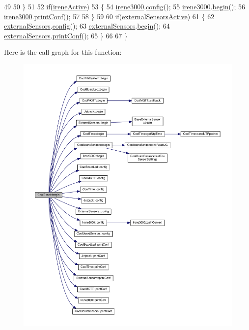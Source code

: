 \begin{DoxyCode}
49 
50     \}
51 
52     \textcolor{keywordflow}{if}(\hyperlink{classCoolBoard_a1de9b5516695b2e1668bf2e3a6701332}{ireneActive})
53     \{
54         \hyperlink{classCoolBoard_ad103718ce316006c4695b8eb312eaf11}{irene3000}.\hyperlink{classIrene3000_afed5c35e4b23963c157847ef27c11e9c}{config}();
55         \hyperlink{classCoolBoard_ad103718ce316006c4695b8eb312eaf11}{irene3000}.\hyperlink{classIrene3000_ad5891806c500ae1007afe52b9e304c2b}{begin}();
56         \hyperlink{classCoolBoard_ad103718ce316006c4695b8eb312eaf11}{irene3000}.\hyperlink{classIrene3000_a7bc2414100b5e19eacc6630fa34b2654}{printConf}();
57 
58     \}
59 
60     \textcolor{keywordflow}{if}(\hyperlink{classCoolBoard_af29860cc422622dc33614f9eabb58c40}{externalSensorsActive})
61     \{
62         \hyperlink{classCoolBoard_a09e26264839c65873eb56af476eff6b2}{externalSensors}.\hyperlink{classExternalSensors_a862a4bd11346b37270d0244c2adabe5a}{config}();
63         \hyperlink{classCoolBoard_a09e26264839c65873eb56af476eff6b2}{externalSensors}.\hyperlink{classExternalSensors_a58ede0d786a86417254708870f04a21e}{begin}();    
64         \hyperlink{classCoolBoard_a09e26264839c65873eb56af476eff6b2}{externalSensors}.\hyperlink{classExternalSensors_a78c2bf55084435dd51d3c559b2d3c6f3}{printConf}();
65     \}
66 
67 \}
\end{DoxyCode}
Here is the call graph for this function\+:
\nopagebreak
\begin{figure}[H]
\begin{center}
\leavevmode
\includegraphics[width=350pt]{classCoolBoard_acba7c5aef7268b2c0044bdb54d3b9d76_cgraph}
\end{center}
\end{figure}
\mbox{\label{classCoolBoard_a583a874c09c07e70a6eb9229fc4beddb}} 
